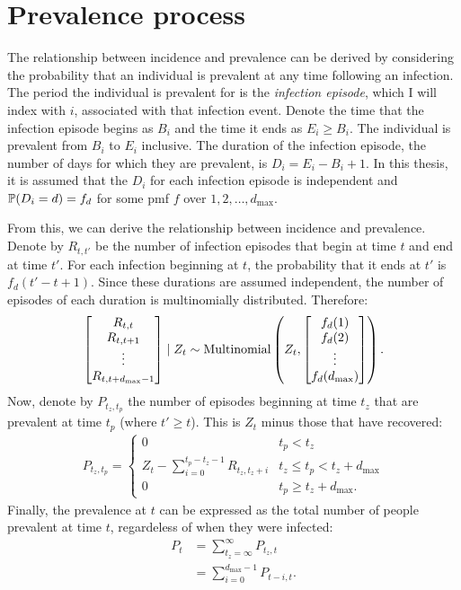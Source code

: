 \documentclass[thesis.tex]{subfiles}
\begin{document}

\section{Prevalence process}

The relationship between incidence and prevalence can be derived by considering the probability that an individual is prevalent at any time following an infection.
The period the individual is prevalent for is the \emph{infection episode}, which I will index with $i$, associated with that infection event.
Denote the time that the infection episode begins as $B_i$ and the time it ends as $E_i \geq B_i$.
The individual is prevalent from $B_i$ to $E_i$ inclusive.
The duration of the infection episode, the number of days for which they are prevalent, is $D_i = E_i - B_i + 1$.
In this thesis, it is assumed that the $D_i$ for each infection episode is independent and $\operatorname{\mathbb{P}}(D_i = d) = f_d$ for some pmf $f$ over $1, 2, \dots, d_\text{max}$.

From this, we can derive the relationship between incidence and prevalence.
Denote by $R_{t,t'}$ be the number of infection episodes that begin at time $t$ and end at time $t'$.
For each infection beginning at $t$, the probability that it ends at $t'$ is $f_d(t' - t + 1)$.
Since these durations are assumed independent, the number of episodes of each duration is multinomially distributed.
Therefore:
\begin{align}
\begin{bmatrix}
  R_{t,t} \\ R_{t,t+1} \\ \vdots \\ R_{t,t+d_\text{max}-1}
\end{bmatrix} \mid Z_t
\sim \operatorname{Multinomial} \left(
  Z_t, 
  \begin{bmatrix}
    f_d(1) \\ f_d(2) \\ \vdots \\ f_d(d_\text{max})
  \end{bmatrix}
\right).
\end{align}
Now, denote by $P_{t_z,t_p}$ the number of episodes beginning at time $t_z$ that are prevalent at time $t_p$ (where $t' \geq t$).
This is $Z_t$ minus those that have recovered:
\begin{align}
    P_{t_z,t_p} = \begin{cases}
      0 &t_p < t_z\\
      Z_t - \sum_{i=0}^{t_p-t_z-1} R_{t_z,t_z+i} &t_z \leq t_p < t_z + d_\text{max}\\
      0 &t_p \geq t_z + d_\text{max}.
  \end{cases} \label{incprev:eq:Ptt-to-R}
\end{align}
Finally, the prevalence at $t$ can be expressed as the total number of people prevalent at time $t$, regardeless of when they were infected:
\begin{align}
  P_t
  &= \sum_{t_z=\infty}^\infty P_{t_z,t} \\
  &= \sum_{i=0}^{d_\text{max}-1} P_{t-i,t} \label{incprev:eq:Pt-to-Ptt}.
\end{align}
\end{document}
